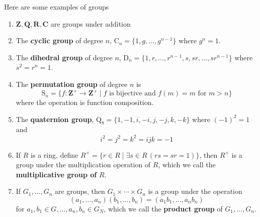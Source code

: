 \documentclass[11pt]{book}
\newcommand{\env}[2]{\begin{#1}#2\end{#1}}
\begin{document}
\begin{example}Here are some examples of groups
\env{enumerate}{
	\item $\mathbf{Z},\mathbf{Q},\mathbf{R},\mathbf{C}$ are groups under addition
	\item The \textbf{cyclic group} of degree $n$, $\mathrm{C}_n=\{1,g,\dots,g^{n-1}\}$ where $g^n=1$.
	\item The \textbf{dihedral group} of degree $n$, $\mathrm{D}_n=\{1,r,\dots,r^{n-1},s,sr,\dots,sr^{n-1}\}$ where $s^2=r^n=1$.
	\item The \textbf{permutation group} of degree $n$ is 
	\[\mathrm{S}_n=\{f:\mathbf{Z}^{+}\rightarrow \mathbf{Z}^{+}\mid f \textrm{\ is\ bijective\ and\ }f(m)=m\textrm{\ for\ }m>n\}\]
	where the operation is function composition.
	\item The \textbf{quaternion group}, $\mathrm{Q}_8=\{1,-1,i,-i,j,-j,k,-k\}$ where $(-1)^2=1$ and \[i^2=j^2=k^2=ijk=-1\]
	\item If $R$ is a ring, define $R^\times=\{r\in R\mid \exists s\in R\,( rs=sr=1)\}$, then $R^\times$ is a group under the multiplication operation of $R$, which we call the \textbf{multiplicative group of} $R$.
	\item If $G_1,\dots,G_n$ are groups, then $G_1\times \cdots\times G_n$ is a group under the operation 
	\[(a_1,\dots,a_n)(b_1,\dots,b_n)=(a_1b_1,\dots,a_nb_n)\] 
	for $a_1,b_1\in G,\dots,a_n,b_n\in G_N$, which we call the \textbf{product group} of $G_1,\dots,G_n$.
}
\end{example}
\end{document}
